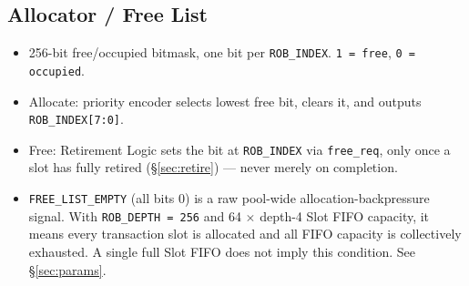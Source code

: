 \subsection{Allocator / Free List}
\label{sec:freelist}
\begin{itemize}[noitemsep]
  \item 256-bit free/occupied bitmask, one bit per \texttt{ROB\_INDEX}. \texttt{1 = free}, \texttt{0 = occupied}.
  \item Allocate: priority encoder selects lowest free bit, clears it, and outputs \texttt{ROB\_INDEX[7:0]}.
  \item Free: Retirement Logic sets the bit at \texttt{ROB\_INDEX} via \texttt{free\_req}, only once a slot has fully retired (\S\ref{sec:retire}) --- never merely on completion.
  \item \texttt{FREE\_LIST\_EMPTY} (all bits 0) is a raw pool-wide allocation-backpressure signal. With \texttt{ROB\_DEPTH = 256} and 64 $\times$ depth-4 Slot FIFO capacity, it means every transaction slot is allocated and all FIFO capacity is collectively exhausted. A single full Slot FIFO does not imply this condition. See \S\ref{sec:params}.
\end{itemize}

